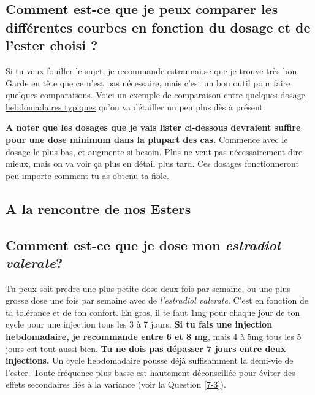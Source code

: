 \documentclass{article}
\begin{document}
\subsection{Comment est-ce que je peux comparer les différentes courbes en fonction du dosage et de l'ester choisi ?}

Si tu veux fouiller le sujet, je recommande \href{http://estrannai.se}{estrannai.se} que je trouve très bon. Garde en tête que ce n'est pas nécessaire, mais c'est un bon outil pour faire quelques comparaisons. \href{https://estrannai.se/\#i0__cu,7,7,1-cu,5,7,3-cu,5,7,2}{Voici un exemple de comparaison entre quelques dosage hebdomadaires typiques} qu'on va détailler un peu plus dès à présent.

\textbf{A noter que les dosages que je vais lister ci-dessous devraient suffire pour une dose minimum dans la plupart des cas.} Commence avec le dosage le plus bas, et augmente si besoin. Plus ne veut pas nécessairement dire mieux, mais on va voir ça plus en détail plus tard. Ces dosages fonctionneront peu importe comment tu as obtenu ta fiole.

\subsection*{A la rencontre de nos Esters}

\subsection{Comment est-ce que je dose mon \textit{estradiol valerate}?}

Tu peux soit predre une plus petite dose deux fois par semaine, ou une plus grosse dose une fois par semaine avec de \textit{l'estradiol valerate}. C'est en fonction de ta tolérance et de ton confort. En gros, il te faut 1mg pour chaque jour de ton cycle pour une injection tous les 3 à 7 jours. \textbf{Si tu fais une injection hebdomadaire, je recommande entre 6 et 8 mg}, mais 4 à 5mg tous les 5 jours est tout aussi bien. \textbf{Tu ne dois pas dépasser 7 jours entre deux injections.} Un cycle hebdomadaire pousse déjà suffisamment la demi-vie de l'ester. Toute fréquence plus basse est hautement déconseillée pour éviter des effets secondaires liés à la variance (voir la Question \ref{7-3}).
\end{document}
